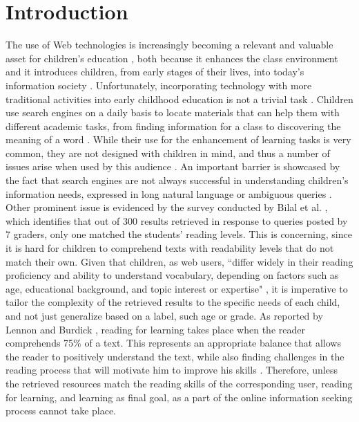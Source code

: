 \documentclass{sig-alternate-05-2015}
\begin{document}


%
%

%
%
\vspace{-0.2cm}
\printccsdesc

\vspace{-0.1cm}

\section{Introduction}
The use of Web technologies is increasingly becoming a relevant and valuable asset for children's education \cite{Kni14}, both because it enhances the class environment and it introduces children, from early stages of their lives, into today's information society \cite{Sad12}. Unfortunately, incorporating technology with more traditional activities into early childhood education is not a trivial task \cite{Dan13}. Children use search engines on a daily basis to locate materials that can help them with different academic tasks, from finding information for a class to discovering the meaning of a word \cite{Kni14}. While their use for the enhancement of learning tasks is very common, they are not designed with children in mind, and thus a number of issues arise when used by this audience \cite{Gos13}. An important barrier is showcased by the fact that search engines are not always successful in understanding children's information needs, expressed in long natural language or ambiguous queries \cite{Bil13}. Other prominent issue is evidenced by the survey conducted by Bilal et al. \cite{Bil13}, which identifies that out of 300 results retrieved in response to queries posted by 7 graders, only one matched the students' reading levels. This is concerning, since it is hard for children to comprehend texts with readability levels that do not match their own. Given that children, as web users, ``differ widely in their reading proficiency and ability to understand vocabulary, depending on factors such as age, educational background, and topic interest or expertise" \cite{Col11}, it is imperative to tailor the complexity of the retrieved results to the specific needs of each child, and not just generalize based on a label, such age or grade. As reported by Lennon and Burdick \cite{Len04}, reading for learning takes place when the reader comprehends 75\% of a text. This represents an appropriate balance that allows the reader to positively understand the text, while also finding challenges in the reading process that will motivate him to improve his skills \cite{Len04}. Therefore, unless the retrieved resources match the reading skills of the corresponding user, reading for learning, and learning as final goal, as a part of the online information seeking process cannot take place. 
\end{document}
